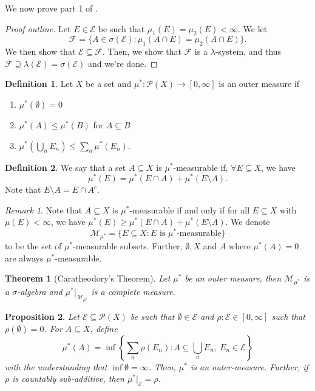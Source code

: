 \documentclass[letterpaper,12pt]{article}
\theoremstyle{definition}
\newtheorem{definition}{Definition}[section]
\theoremstyle{plain}
\newtheorem{thm}{Theorem}[section]
\newtheorem{proposition}[thm]{Proposition}
\theoremstyle{remark}
\newtheorem*{remark}{Remark}
\begin{document}
We now prove part 1 of .

\begin{proof}[Proof outline]
Let $E\in \mathcal{E}$ be such that $\mu_1(E) = \mu_2(E)<\infty$. We let
\[\mathcal{F} = \{A\in \sigma(\mathcal{E}):\mu_1(A\cap E) = \mu_2(A\cap E)\}.\]
We then show that $\mathcal{E}\subseteq \mathcal{F}$. Then, we show that $\mathcal{F}$ is a $\lambda$-system, and thus $\mathcal{F}\supseteq \lambda(\mathcal{E})=\sigma(\mathcal{E})$ and we're done.
\end{proof}

\begin{definition}
Let $X$ be a set and $\mu^*:\mathcal{P}(X)\to[0,\infty]$ is an outer measure if
\begin{enumerate}
  \item $\mu^*(\emptyset)=0$
  \item $\mu^*(A)\leq \mu^*(B)$ for $A\subseteq B$
  \item $\mu^* \left(\bigcup_n E_n\right)\leq \sum_n \mu^*(E_n)$.
\end{enumerate}
\end{definition}

\begin{definition}
We say that a set $A\subseteq X$ is $\mu^*$-measurable if, $\forall E\subseteq X$, we have
\[\mu^*(E) = \mu^*(E\cap A) + \mu^*(E\setminus A).\]
Note that $E\setminus A = E\cap A^c$.
\end{definition}

\begin{remark}
Note that $A\subseteq X$ is $\mu^*$-measurable if and only if for all $E\subseteq X$ with $\mu(E)<\infty$, we have $\mu^*(E)\geq \mu^*(E\cap A)+\mu^*(E\setminus A)$. We denote
\[\mathcal{M}_{\mu^*} = \{E\subseteq X:E\text{ is $\mu^*$-measurable}\}\]
to be the set of $\mu^*$-measurable subsets. Further, $\emptyset,X$ and $A$ where $\mu^*(A)=0$ are always $\mu^*$-measurable.
\end{remark}

\begin{thm}[Caratheodory's Theorem]
Let $\mu^*$ be an outer measure, then $\mathcal{M}_{\mu^*}$ is a $\sigma$-algebra and $\mu^*\big|_{\mathcal{M}_{\mu^*}}$ is a complete measure.
\end{thm}

\begin{proposition}
Let $\mathcal{E}\subseteq \mathcal{P}(X)$ be such that $\emptyset\in\mathcal{E}$ and $\rho:\mathcal{E}\in[0,\infty]$ such that $\rho(\emptyset)=0$. For $A\subseteq X$, define
\[\mu^*(A) = \inf\left\{\sum_n \rho(E_n):A\subseteq \bigcup_n E_n,\ E_n\in \mathcal{E}\right\}\]
with the understanding that $\inf\emptyset=\infty$. Then, $\mu^*$ is an outer-measure. Further, if $\rho$ is countably sub-additive, then $\mu^*\big|_{\mathcal{E}} = \rho$.
\end{proposition}
\end{document}
